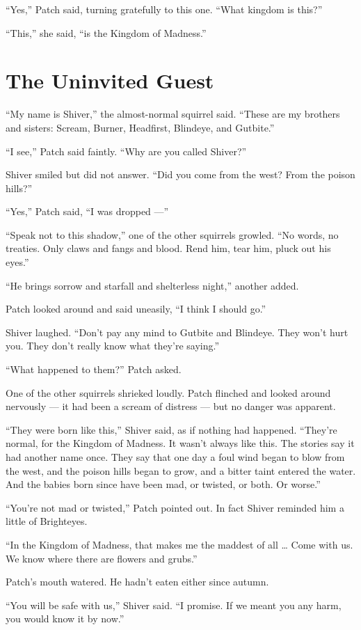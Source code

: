 \documentclass[ebook,oneside,openany,17pt]{memoir}
\newenvironment{tolerant}[1]{%
  \par\tolerance=#1\relax
}{%
  \par
}
\renewcommand{\thechapter}{\Roman{chapter}}
\newcounter{sections}
\newcommand{\sections}[1]{%
  \section*{#1}
  \addtocounter{sections}{1}%
  \pdfbookmark[1]{#1}{section.\thechapter.\thesections}}
\begin{document}
“Yes,” Patch said, turning gratefully to this one. “What kingdom is
this?”

“This,” she said, “is the Kingdom of Madness.”


\sections{The Uninvited Guest}

\begin{tolerant}{500}
“My name is Shiver,” the almost-normal squirrel said. “These are my
brothers and sisters: Scream, Burner, Headfirst, Blindeye, and
Gutbite.”
\end{tolerant}

“I see,” Patch said faintly. “Why are you called Shiver?”

Shiver smiled but did not answer. “Did you come from the west? From
the poison hills?”

“Yes,” Patch said, “I was dropped —”

“Speak not to this shadow,” one of the other squirrels growled. “No
words, no treaties. Only claws and fangs and blood. Rend him, tear
him, pluck out his eyes.”

“He brings sorrow and starfall and shelterless night,” another added.

Patch looked around and said uneasily, “I think I should go.”

Shiver laughed. “Don’t pay any mind to Gutbite and Blindeye. They
won’t hurt you. They don’t really know what they’re saying.”

“What happened to them?” Patch asked.

One of the other squirrels shrieked loudly. Patch flinched and looked
around nervously — it had been a scream of distress — but no danger
was apparent.

“They were born like this,” Shiver said, as if nothing had
happened. “They’re normal, for the Kingdom of Madness. It wasn’t
always like this. The stories say it had another name once. They say
that one day a foul wind began to blow from the west, and the poison
hills began to grow, and a bitter taint entered the water. And the
babies born since have been mad, or twisted, or both. Or worse.”

“You’re not mad or twisted,” Patch pointed out. In fact Shiver
reminded him a little of Brighteyes.

“In the Kingdom of Madness, that makes me the maddest of all … Come
with us. We know where there are flowers and grubs.”

Patch’s mouth watered. He hadn’t eaten either since autumn.

“You will be safe with us,” Shiver said. “I promise. If we meant you
any harm, you would know it by now.”
\end{document}
